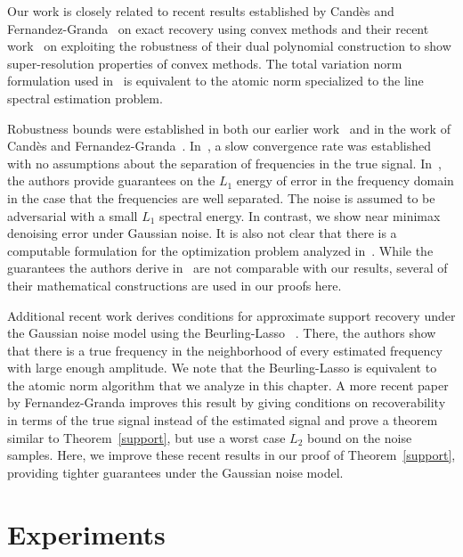 Our work is closely related to recent results established by Cand\`es and
Fernandez-Granda~\cite{cg_exact12} on exact recovery using convex methods and
their recent work~\cite{cg_noisy} on exploiting the robustness of their dual
polynomial construction to show super-resolution properties of convex methods.
The total variation norm formulation used in~\cite{cg_noisy} is equivalent to
the atomic norm specialized to the line spectral estimation problem.

Robustness bounds were established in both our earlier work~\cite{btr12} and in
the work of Cand\`es and Fernandez-Granda~\cite{cg_noisy}. In~\cite{btr12}, a
slow convergence rate was established with no assumptions about the separation
of frequencies in the true signal. In~\cite{cg_noisy}, the authors provide
guarantees on the $L_1$ energy of error in the frequency domain in the case
that the frequencies are well separated. The noise is assumed to be adversarial
with a small $L_1$ spectral energy. In contrast, we show near minimax
denoising error under Gaussian noise. It is also not clear that there is a
computable formulation for the optimization problem analyzed
in~\cite{cg_noisy}. While the guarantees the authors derive in~\cite{cg_noisy}
are not comparable with our results, several of their mathematical
constructions are used in our proofs here.

Additional recent work derives conditions for approximate support recovery
under the Gaussian noise model using the Beurling-Lasso ~\cite{azais}. There,
the authors show that there is a true frequency in the neighborhood of every
estimated frequency with large enough amplitude. We note that the
Beurling-Lasso is equivalent to the atomic norm algorithm that we analyze in
this chapter. A more recent paper by Fernandez-Granda{\cite{granda2}} improves
this result by giving conditions on recoverability in terms of the true signal
instead of the estimated signal and prove a theorem similar to
Theorem~\ref{support}, but use a worst case $L_2$ bound on the noise samples.
Here, we improve these recent results in our proof of Theorem~\ref{support},
providing tighter guarantees under the Gaussian noise model.
 


\section{Experiments}
\label{sec:experiments}


